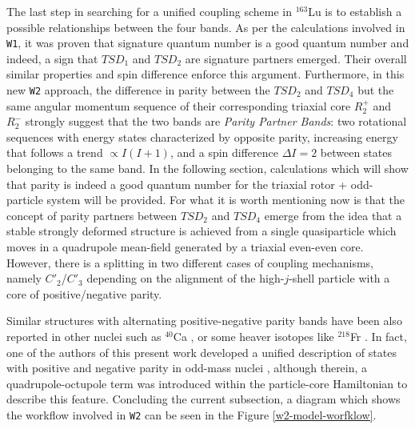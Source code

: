 \documentclass[11pt]{article}
\begin{document}
The last step in searching for a unified coupling scheme in $^{163}$Lu is to establish a possible relationships between the four bands. As per the calculations involved in \texttt{W1}, it was proven that signature quantum number is a good quantum number and indeed, a sign that $TSD_1$ and $TSD_2$ are signature partners emerged. Their overall similar properties and spin difference enforce this argument. Furthermore, in this new \texttt{W2} approach, the difference in parity between the $TSD_2$ and $TSD_4$ but the same angular momentum sequence of their corresponding triaxial core $R_2^+$ and $R_2^-$ strongly suggest that the two bands are \emph{Parity Partner Bands}: two rotational sequences with energy states characterized by opposite parity, increasing energy that follows a trend $\propto I(I+1)$, and a spin difference $\Delta I=2$ between states belonging to the same band. In the following section, calculations which will show that parity is indeed a good quantum number for the triaxial rotor + odd-particle system will be provided. For what it is worth mentioning now is that the concept of parity partners between $TSD_2$ and $TSD_4$ emerge from the idea that a stable strongly deformed structure is achieved from a single quasiparticle which moves in a quadrupole mean-field generated by a triaxial even-even core. However, there is a splitting in two different cases of coupling mechanisms, namely $C'_2$/$C'_3$ depending on the alignment of the high-$j$-shell particle with a core of positive/negative parity.

Similar structures with alternating positive-negative parity bands have been also reported in other nuclei such as $^{40}$Ca \cite{torilov2004spectroscopy}, or some heaver isotopes like $^{218}$Fr \cite{debray2000alternating}. In fact, one of the authors of this present work developed a unified description of states with positive and negative parity in odd-mass nuclei \cite{radutaa2009csm,raduta2011simultaneous}, although therein, a quadrupole-octupole term was introduced within the particle-core Hamiltonian to describe this feature. Concluding the current subsection, a diagram which shows the workflow involved in \texttt{W2} can be seen in the Figure \ref{w2-model-worfklow}.
\end{document}
